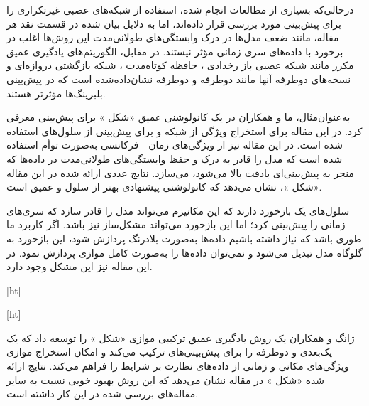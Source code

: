درحالی‌که بسیاری از مطالعات انجام شده، استفاده از شبکه‌های عصبی غیرتکراری را برای پیش‌بینی  مورد بررسی قرار داده‌اند، اما به دلایل بیان شده در قسمت نقد هر مقاله، مانند ضعف مدل‌ها در درک وابستگی‌های طولانی‌مدت این روش‌ها اغلب در برخورد با داده‌های سری زمانی مؤثر نیستند. در مقابل، الگوریتم‌های یادگیری عمیق مکرر مانند شبکه عصبی باز رخدادی ، حافظه کوتاه‌مدت ، شبکه بازگشتی دروازه‌ای  و نسخه‌های دوطرفه آنها مانند  دوطرفه  و  دوطرفه نشان‌داده‌شده است که در پیش‌بینی  بلبرینگ‌ها مؤثرتر هستند. 





به‌عنوان‌مثال، ما و همکاران در  یک  کانولوشنی عمیق «شکل » برای پیش‌بینی  معرفی کرد. در این مقاله برای استخراج ویژگی از شبکه  و برای پیش‌بینی از سلول‌های  استفاده شده است. در این مقاله نیز از ویژگی‌های زمان - فرکانسی به‌صورت توأم استفاده شده است که مدل را قادر به درک و حفظ وابستگی‌های طولانی‌مدت در داده‌ها که منجر به پیش‌بینی‌ای بادقت بالا می‌شود، می‌سازد. نتایج عددی ارائه شده در این مقاله «شکل »، نشان می‌دهد که  کانولوشنی پیشنهادی بهتر از سلول  و  عمیق است.



سلول‌های  یک بازخورد دارند که این مکانیزم می‌تواند مدل را قادر سازد که سری‌های زمانی را پیش‌بینی کرد؛ اما این بازخورد می‌تواند مشکل‌ساز نیز باشد. اگر کاربرد ما طوری باشد که نیاز داشته باشیم داده‌ها به‌صورت بلادرنگ پردازش شود، این بازخورد به گلوگاه مدل تبدیل می‌شود و نمی‌توان داده‌ها را به‌صورت کامل موازی پردازش نمود. در این مقاله نیز این مشکل وجود دارد.




[ht]



[ht]





ژانگ و همکاران  یک روش یادگیری عمیق ترکیبی موازی «شکل » را توسعه داد که یک  یک‌بعدی و  دوطرفه را برای پیش‌بینی‌های  ترکیب می‌کند و امکان استخراج موازی ویژگی‌های مکانی و زمانی از داده‌های نظارت بر شرایط را فراهم می‌کند. نتایج ارائه شده «شکل » در مقاله نشان می‌دهد که این روش بهبود خوبی نسبت به سایر مقاله‌های بررسی شده در این کار داشته است.



